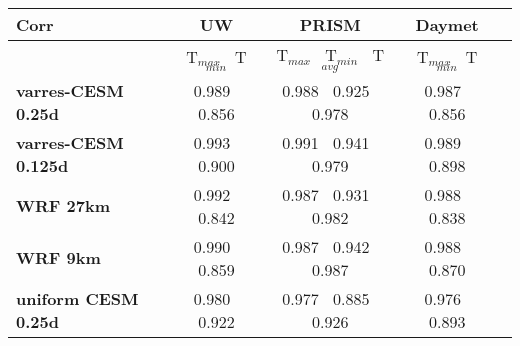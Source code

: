 \begin{table}
\begin{center}
\begin{tabular}{lcccc}
\hline \textbf{Corr} & \textbf{UW}  & \textbf{PRISM} & \textbf{Daymet} \\
\hline $    $ & T$_{max}$ $\     $  T$_{min}$ & T$_{max}$ $\     $  T$_{min}$ $\     $ T$_{avg}$& T$_{max}$ $\     $  T$_{min}$\\
\hline \textbf{varres-CESM 0.25d} & 0.989 $\ $ 0.856 & 0.988 $\ $ 0.925 $\ $ 0.978 & 0.987 $\ $ 0.856 \\
\textbf{varres-CESM 0.125d} & 0.993 $\ $ 0.900 & 0.991 $\ $ 0.941 $\ $ 0.979 & 0.989 $\ $ 0.898 \\
\textbf{WRF 27km} & 0.992 $\ $ 0.842 & 0.987 $\ $ 0.931 $\ $ 0.982 & 0.988 $\ $ 0.838 \\
\textbf{WRF 9km} & 0.990 $\ $ 0.859 & 0.987 $\ $ 0.942 $\ $ 0.987 & 0.988 $\ $ 0.870 \\
\textbf{uniform CESM 0.25d} & 0.980 $\ $ 0.922 & 0.977 $\ $ 0.885 $\ $ 0.926 & 0.976 $\ $ 0.893 \\
\hline
\end{tabular}
\end{center}
\end{table}


